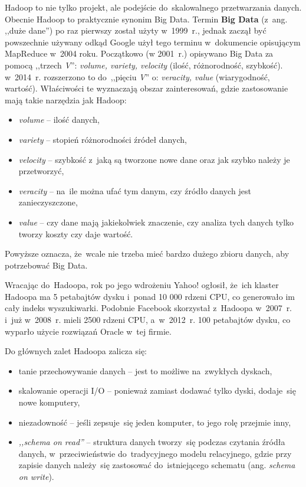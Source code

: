 \documentclass[12pt,a4paper,twoside,titlepage,openright]{book}
\begin{document}
Hadoop to nie tylko projekt, ale podejście do~skalowalnego przetwarzania danych. \cite{hadoop} Obecnie Hadoop to praktycznie synonim Big Data. \cite{bigData} Termin \textbf{Big Data} (z~ang. ,,duże dane'') po raz pierwszy został użyty w~1999~r., jednak zaczął być powszechnie używany odkąd Google użył tego terminu w~dokumencie opisującym MapReduce w~2004 roku. Początkowo (w 2001~r.) opisywano Big Data za pomocą ,,trzech \textit{V}'': \textit{volume, variety, velocity} (ilość, różnorodność, szybkość). w~2014~r. rozszerzono to do~,,pięciu \textit{V}'' o: \textit{veracity, value} (wiarygodność, wartość).\cite{realTimeProcessing} Właściwości te wyznaczają obszar zainteresowań, gdzie zastosowanie mają takie narzędzia jak Hadoop:
\begin{itemize}
\item \textit{volume} -- ilość danych,
\item \textit{variety} -- stopień różnorodności źródeł danych,
\item \textit{velocity} -- szybkość z~jaką są tworzone nowe dane oraz jak szybko należy je przetworzyć,
\item \textit{veracity} -- na~ile można ufać tym danym, czy źródło danych jest zanieczyszczone,
\item \textit{value} -- czy dane mają jakiekolwiek znaczenie, czy analiza tych danych tylko tworzy koszty czy daje wartość.
\end{itemize}
Powyższe oznacza, że~wcale nie trzeba mieć bardzo dużego zbioru danych, aby potrzebować Big Data. \cite{hadoop}

Wracając do~Hadoopa, rok po jego wdrożeniu Yahoo! ogłosił, że~ich klaster Hadoopa ma 5 petabajtów dysku i~ponad 10 000 rdzeni CPU, co generowało im cały indeks wyszukiwarki. Podobnie Facebook skorzystał z~Hadoopa w~2007~r. i~już w~2008~r. mieli 2500 rdzeni CPU, a~w~2012~r. 100 petabajtów dysku, co wyparło użycie rozwiązań Oracle w~tej firmie.

Do głównych zalet Hadoopa zalicza się:
\begin{itemize}
\item tanie przechowywanie danych -- jest to możliwe na~zwykłych dyskach,
\item skalowanie operacji I/O -- ponieważ zamiast dodawać tylko dyski, dodaje~się nowe komputery,
\item niezadowność -- jeśli zepsuje~się jeden komputer, to jego rolę przejmie inny,
\item \textit{,,schema on read''} -- struktura danych tworzy~się podczas czytania źródła danych, w~przeciwieństwie do~tradycyjnego modelu relacyjnego, gdzie przy zapisie danych należy~się zastosować do~istniejącego schematu (ang. \textit{schema on write}).
\end{itemize}
\end{document}
